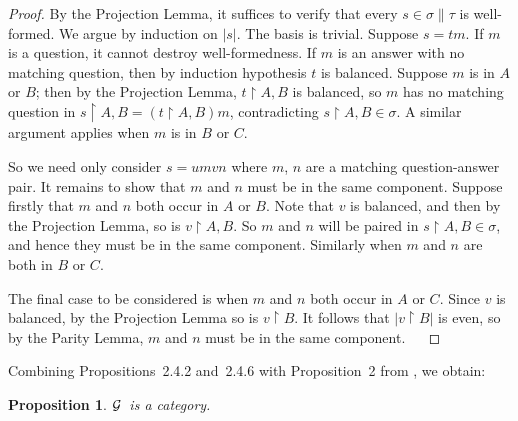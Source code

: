 \documentclass[11pt]{article}
\newtheorem{proposition}[theorem]{Proposition}
\newcommand{\Rest}{{\upharpoonright}}
\newcommand{\Games}{\mbox{$\cal{G}$}}
\begin{document}
\begin{proof} By the Projection Lemma, it suffices to verify that
every $s \in \sigma \| \tau$ is well-formed. We argue by induction
on $|s|$. The basis is trivial. Suppose $s = tm$. If $m$ is a
question, it cannot destroy well-formedness. If $m$ is an answer
with no matching question, then by induction hypothesis $t$ is
balanced. Suppose $m$ is in $A$ or $B$; then by the Projection
Lemma, $t \Rest A, B$ is balanced, so $m$ has no matching question
in $s \Rest A,B = (t \Rest A, B)m$, contradicting $s \Rest A, B
\in \sigma$. A similar argument applies when $m$ is in $B$ or $C$.

So we need only consider $s = umvn$ where $m$, $n$ are a matching question-answer pair.
It remains to show  that $m$ and $n$ must be in the same component.
Suppose firstly that $m$ and $n$ both occur in $A$ or $B$. Note that $v$ is
balanced, and then by the Projection Lemma, so is $v \Rest A,B$.
So $m$ and $n$ will be paired in $s \Rest A, B \in \sigma$, and hence they
must be in the same component. Similarly when $m$ and $n$ are both in $B$ or
$C$.

The final case to be considered is when $m$ and $n$ both occur in
$A$ or $C$. Since $v$ is balanced, by the Projection Lemma so is
$v \Rest B$. It follows that $|v \Rest B|$ is even, so by the
Parity Lemma, $m$ and $n$ must be in the same component. $\;\;\;
$
\end{proof}


Combining Propositions~2.4.2 and~2.4.6 with Proposition~2 from \cite{AbramskyS:gamfcm}, we obtain:

\begin{proposition}
\Games\ is a category.
\end{proposition}
\end{document}
